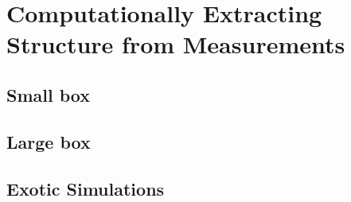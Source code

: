 \section{Computationally Extracting Structure from Measurements}

\subsection{Small box}
\subsection{Large box}
\subsection{Exotic Simulations}
